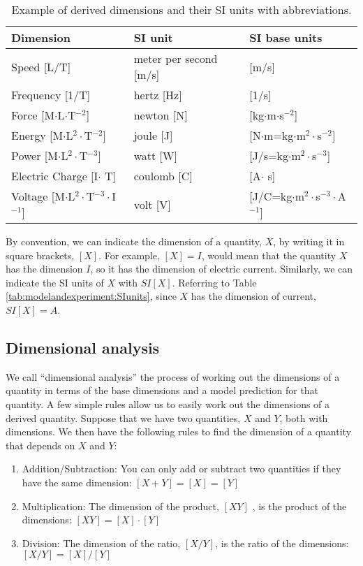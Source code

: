\begin{table}[!h]
\centering
\begin{tabular}{lll }  
\textbf{Dimension}&\textbf{SI unit}&\textbf{SI base units}\\
\hline
\hline
Speed [L/T]& meter per second [m/s] & [m/s]\\ \hline
Frequency [1/T]& hertz [Hz] & [1/s]\\ \hline
Force [M$\cdot$L$\cdot$T$^{-2}$]& newton [N]&[kg$\cdot$m$\cdot$s$^{-2}$]\\ \hline
Energy [M$\cdot$L$^2\cdot$T$^{-2}$]& joule [J]&[N$\cdot$m=kg$\cdot$m$^2\cdot$s$^{-2}$] \\ \hline
Power [M$\cdot$L$^2\cdot$T$^{-3}$]& watt [W]&[J/s=kg$\cdot$m$^2\cdot$s$^{-3}$]\\ \hline
Electric Charge [I$\cdot$ T]& coulomb [C]&[A$\cdot$ s] \\ \hline
Voltage [M$\cdot$L$^2\cdot$T$^{-3}\cdot$I$^{-1}$]& volt [V]&[J/C=kg$\cdot$m$^2\cdot$s$^{-3}\cdot$A$^{-1}$] \\ \hline
\end{tabular}
\caption{\label{tab:modelandexperiment:derivedSIunits} Example of derived dimensions and their SI units with abbreviations.}
\end{table}

By convention, we can indicate the dimension of a quantity, $X$, by writing it in square brackets, $[X]$. For example, $[X]=I$, would mean that the quantity $X$ has the dimension $I$, so it has the dimension of electric current. Similarly, we can indicate the SI units of $X$ with $SI[X]$. Referring to Table \ref{tab:modelandexperiment:SIunits}, since $X$ has the dimension of current, $SI[X]=A$.

\subsection{Dimensional analysis}
We call ``dimensional analysis'' the process of working out the dimensions of a quantity in terms of the base dimensions and a model prediction for that quantity. A few simple rules allow us to easily work out the dimensions of a derived quantity. Suppose that we have two quantities, $X$ and $Y$, both with dimensions. We then have the following rules to find the dimension of a quantity that depends on $X$ and $Y$:
\begin{enumerate}
\item Addition/Subtraction: You can only add or subtract two quantities if they have the same dimension: $[X+Y]=[X]=[Y]$
\item Multiplication: The dimension of the product, $[XY]$ , is the product of the dimensions: $[XY]=[X]\cdot[Y]$
\item Division: The dimension of the ratio, $[X/Y]$, is the ratio of the dimensions: $[X/Y]=[X]/[Y]$
\end{enumerate}

